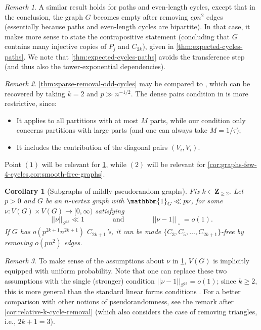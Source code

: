 \documentclass[reqno,11pt]{amsart}
\newtheorem{corollary}[theorem]{Corollary}
\theoremstyle{definition}
\theoremstyle{remark}
\newtheorem*{remark}{Remark}
\numberwithin{equation}{section}
\newcommand{\Z}{\mathbf{Z}}
\newcommand{\one}{\mathbbm{1}}
\newcommand{\sq}{_{\substack{ \\ \square}}}
\begin{document}
\begin{remark}
A similar result holds for paths and even-length cycles, except that in the conclusion, the graph $G$ becomes empty after removing $\epsilon p n^2$ edges (essentially because paths and even-length cycles are bipartite). In that case, it makes more sense to state the contrapositive statement (concluding that $G$ contains many injective copies of $P_j$ and $C_{2k}$), given in \cref{thm:expected-cycles-paths}. We note that \cref{thm:expected-cycles-paths} avoids the transference step (and thus also the tower-exponential dependencies).
\end{remark}

\begin{remark}
\cref{thm:sparse-removal-odd-cycles} may be compared to \cite[Proposition 4.2]{conlon2021regularity}, which can be recovered by taking $k = 2$ and $p \gg n^{-1/2}$. The dense pairs condition in \cite[Proposition 4.2]{conlon2021regularity} is more restrictive, since:
\begin{itemize} 
    \item[(1).] It applies to all partitions with at most $M$ parts, while our condition only concerns partitions with large parts (and one can always take $M = 1/\tau$);
    \item[(2).] It includes the contribution of the diagonal pairs $(V_i, V_i)$.
\end{itemize} 
Point $(1)$ will be relevant for \cref{cor:subgraphs-pseudorandom}, while $(2)$ will be relevant for \cref{cor:graphs-few-4-cycles,cor:smooth-free-graphs}.
\end{remark}


\begin{corollary}[Subgraphs of mildly-pseudorandom graphs] \label{cor:subgraphs-pseudorandom}
Fix $k \in \Z_{\ge 2}$. Let $p > 0$ and $G$ be an $n$-vertex graph with $\one_{G} \ll p\nu$, for some $\nu : V(G) \times V(G) \to [0, \infty)$ satisfying
\[
    ||\nu||_{S^{2k}} \ll 1 
    \qquad\qquad 
    \text{and} 
    \qquad\qquad 
    ||\nu - 1||\sq = o(1).
\]
If $G$ has $o(p^{2k+1} n^{2k+1})$ $C_{2k+1}$'s, it can be made $\{C_3, C_5, \ldots, C_{2k+1}\}$-free by removing $o(pn^2)$ edges.
\end{corollary}

\begin{remark}
To make sense of the assumptions about $\nu$ in \cref{cor:subgraphs-pseudorandom}, $V(G)$ is implicitly equipped with uniform probability. Note that one can replace these two assumptions with the single (stronger) condition $||\nu - 1||_{S^{2k}} = o(1)$; since $k \ge 2$, this is more general than the standard linear forms conditions \cite{conlon2014green,tao2006gaussian,tao2007ergodic}. For a better comparison with other notions of pseudorandomness, see the remark after \cref{cor:relative-k-cycle-removal} (which also considers the case of removing triangles, i.e., $2k+1 = 3$).
\end{remark}
\end{document}
